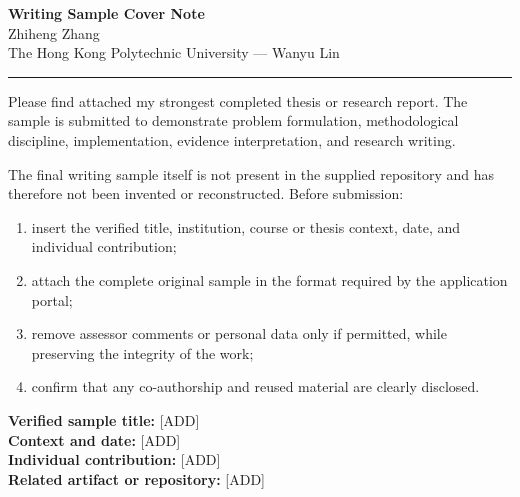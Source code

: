\documentclass[11pt]{article}
\newcommand{\ApplicantName}{Zhiheng Zhang}
\begin{document}
\begin{center}
{\LARGE\bfseries Writing Sample Cover Note}\\[0.25em]
{\large \ApplicantName}\\
The Hong Kong Polytechnic University --- Wanyu Lin
\end{center}
\vspace{0.35em}\hrule\vspace{0.65em}

Please find attached my strongest completed thesis or research report. The sample is submitted to demonstrate problem formulation, methodological discipline, implementation, evidence interpretation, and research writing.

The final writing sample itself is not present in the supplied repository and has therefore not been invented or reconstructed. Before submission:
\begin{enumerate}
\item insert the verified title, institution, course or thesis context, date, and individual contribution;
\item attach the complete original sample in the format required by the application portal;
\item remove assessor comments or personal data only if permitted, while preserving the integrity of the work;
\item confirm that any co-authorship and reused material are clearly disclosed.
\end{enumerate}

\textbf{Verified sample title:} [ADD]\\
\textbf{Context and date:} [ADD]\\
\textbf{Individual contribution:} [ADD]\\
\textbf{Related artifact or repository:} [ADD]
\end{document}
